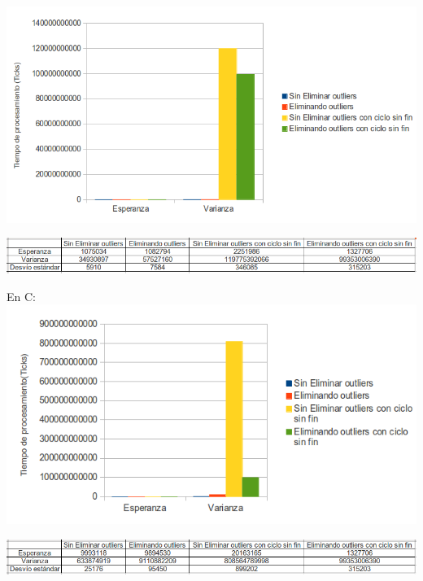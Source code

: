 \documentclass[a4paper]{article}
\begin{document}
\includegraphics[width=\textwidth,height=\textheight,keepaspectratio
]{graficoasm.png}
\begin {flushleft}
\end{flushleft}
\vspace{0.4cm}
\includegraphics[width=\textwidth,height=\textheight,keepaspectratio
]{tablaASM.png}
\begin {flushleft}
\end{flushleft}
\newpage
En C: \newline
\includegraphics[width=\textwidth,height=\textheight,keepaspectratio
]{graficoC.png}
\begin {flushleft}
\end{flushleft}
\vspace{0.4cm}
\includegraphics[width=\textwidth,height=\textheight,keepaspectratio
]{tablaC.png}
\begin {flushleft}
\end{flushleft}
\end{document}
